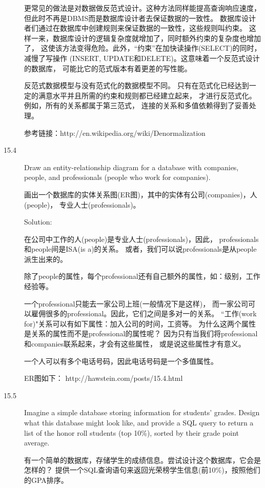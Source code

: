 \begin{description}
更常见的做法是对数据做反范式设计。这种方法同样能提高查询响应速度， 但此时不再是DBMS而是数据库设计者去保证数据的一致性。 数据库设计者们通过在数据库中创建规则来保证数据的一致性，这些规则叫约束。 这样一来，数据库设计的逻辑复杂度就增加了，同时额外约束的复杂度也增加了， 这使该方法变得危险。此外，“约束”在加快读操作(SELECT)的同时，减慢了写操作 (INSERT, UPDATE和DELETE)。这意味着一个反范式设计的数据库， 可能比它的范式版本有着更差的写性能。

反范式数据模型与没有范式化的数据模型不同。 只有在范式化已经达到一定的满意水平并且所需的约束和规则都已经建立起来， 才进行反范式化。例如，所有的关系都属于第三范式， 连接的关系和多值依赖得到了妥善处理。

参考链接：http://en.wikipedia.org/wiki/Denormalization


\item[15.4] Draw an entity-relationship diagram for a database with companies, people, and professionals (people who work for companies).

画出一个数据库的实体关系图(ER图)，其中的实体有公司(companies)，人(people)， 专业人士(professionals)。

Solution: 

在公司中工作的人(people)是专业人士(professionals)，因此， professionals和people间是ISA(is a)的关系。 或者，我们可以说professionals是从people派生出来的。

除了people的属性，每个professional还有自己额外的属性，如：级别，工作经验等。

一个professional只能去一家公司上班(一般情况下是这样)， 而一家公司可以雇佣很多的professional。因此，它们之间是多对一的关系。 “工作(work for)"关系可以有如下属性：加入公司的时间，工资等。 为什么这两个属性是关系的属性而不是professional的属性呢？ 因为只有当我们将professional和companies联系起来，才会有这些属性， 或是说这些属性才有意义。

一个人可以有多个电话号码，因此电话号码是一个多值属性。

ER图如下：  http://hawstein.com/posts/15.4.html


\item[15.5] Imagine a simple database storing information for students’ grades. Design what this database might look like, and provide a SQL query to return a list of the honor roll students (top 10\%), sorted by their grade point average.

有一个简单的数据库，存储学生的成绩信息。尝试设计这个数据库，它会是怎样的？ 提供一个SQL查询语句来返回光荣榜学生信息(前10\%)，按照他们的GPA排序。


\end{description}

